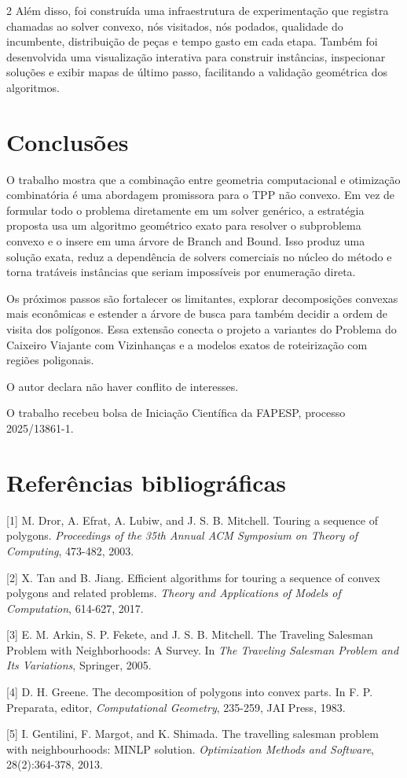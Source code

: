 \documentclass[10pt,a4paper]{article}
\begin{document}
\begin{multicols}{2}
Além disso, foi construída uma infraestrutura de experimentação que registra chamadas ao solver convexo, nós visitados, nós podados, qualidade do incumbente, distribuição de peças e tempo gasto em cada etapa. Também foi desenvolvida uma visualização interativa para construir instâncias, inspecionar soluções e exibir mapas de último passo, facilitando a validação geométrica dos algoritmos.

\section{Conclusões}

O trabalho mostra que a combinação entre geometria computacional e otimização combinatória é uma abordagem promissora para o TPP não convexo. Em vez de formular todo o problema diretamente em um solver genérico, a estratégia proposta usa um algoritmo geométrico exato para resolver o subproblema convexo e o insere em uma árvore de Branch and Bound. Isso produz uma solução exata, reduz a dependência de solvers comerciais no núcleo do método e torna tratáveis instâncias que seriam impossíveis por enumeração direta.

Os próximos passos são fortalecer os limitantes, explorar decomposições convexas mais econômicas e estender a árvore de busca para também decidir a ordem de visita dos polígonos. Essa extensão conecta o projeto a variantes do Problema do Caixeiro Viajante com Vizinhanças e a modelos exatos de roteirização com regiões poligonais.

O autor declara não haver conflito de interesses.

O trabalho recebeu bolsa de Iniciação Científica da FAPESP, processo 2025/13861-1.

\section{Referências bibliográficas}

[1] M. Dror, A. Efrat, A. Lubiw, and J. S. B. Mitchell. Touring a sequence of polygons. \textit{Proceedings of the 35th Annual ACM Symposium on Theory of Computing}, 473-482, 2003.

[2] X. Tan and B. Jiang. Efficient algorithms for touring a sequence of convex polygons and related problems. \textit{Theory and Applications of Models of Computation}, 614-627, 2017.

[3] E. M. Arkin, S. P. Fekete, and J. S. B. Mitchell. The Traveling Salesman Problem with Neighborhoods: A Survey. In \textit{The Traveling Salesman Problem and Its Variations}, Springer, 2005.

[4] D. H. Greene. The decomposition of polygons into convex parts. In F. P. Preparata, editor, \textit{Computational Geometry}, 235-259, JAI Press, 1983.

[5] I. Gentilini, F. Margot, and K. Shimada. The travelling salesman problem with neighbourhoods: MINLP solution. \textit{Optimization Methods and Software}, 28(2):364-378, 2013.

\end{multicols}
\end{document}
